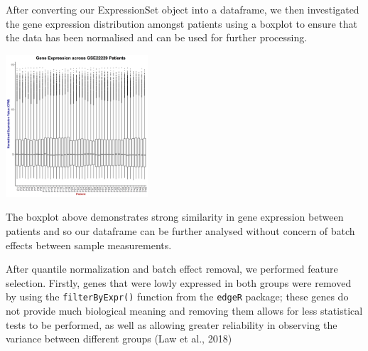\documentclass[a4paper,9pt,twocolumn,twoside,]{pinp}
\begin{document}
\begin{Shaded}
\begin{Highlighting}[]
\NormalTok{(}\NormalTok{)}
\StringTok{ }\NormalTok{()}
\StringTok{ }
\StringTok{ }

\NormalTok{(}\NormalTok{)}
 \NormalTok{)}
\StringTok{ }\NormalTok{(}
     \NormalTok{, }
     \NormalTok{)}
\end{Highlighting}
\end{Shaded}

After converting our ExpressionSet object into a dataframe, we then
investigated the gene expression distribution amongst patients using a
boxplot to ensure that the data has been normalised and can be used for
further processing.

\begin{center}\includegraphics[width=200px]{images/part3boxplot} \end{center}

The boxplot above demonstrates strong similarity in gene expression
between patients and so our dataframe can be further analysed without
concern of batch effects between sample measurements.

After quantile normalization and batch effect removal, we performed
feature selection. Firstly, genes that were lowly expressed in both
groups were removed by using the \texttt{filterByExpr()} function from
the \texttt{edgeR} package; these genes do not provide much biological
meaning and removing them allows for less statistical tests to be
performed, as well as allowing greater reliability in observing the
variance between different groups (Law et al., 2018)
\end{document}
